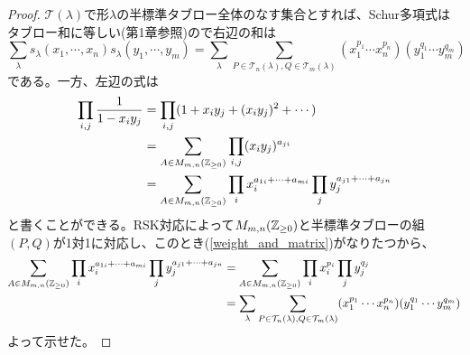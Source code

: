 \documentclass{ltjsreport}
\begin{document}
\begin{proof}
  $\mathcal{T}(\lambda)$で形$\lambda$の半標準タブロー全体のなす集合とすれば、Schur多項式はタブロー和に等しい(第1章参照)ので右辺の和は
  \[
  \sum_{\lambda}s_\lambda(x_1,\cdots,x_n)s_\lambda(y_1,\cdots,y_m)
  =\sum_{\lambda}
  \sum_{P\in\mathcal{T}_n(\lambda),Q\in\mathcal{T}_m(\lambda)}
  (x_1^{p_1}\cdots x_n^{p_n})(y_1^{q_1}\cdots y_m^{q_m})
  \]
  である。一方、左辺の式は
  \begin{align*}
  \prod_{i,j}\frac{1}{1-x_iy_j}&=\prod_{i,j}(1+x_iy_j+(x_iy_j)^2+\cdots)\\
  &=\sum_{A\in M_{m,n}(\mathbb{Z}_{\geq 0})}\prod_{i,j}(x_iy_j)^{a_{ji}}\\
  &=\sum_{A\in M_{m,n}(\mathbb{Z}_{\geq 0})}\prod_i x_i^{a_{1i}+\cdots+a_{mi}}\prod_j y_j^{a_{j1}+\cdots+a_{jn}}
  \end{align*}
  と書くことができる。RSK対応によって$M_{m,n}(\mathbb{Z}_{\geq 0})$と半標準タブローの組$(P,Q)$が1対1に対応し、このとき(\ref{weight_and_matrix})がなりたつから、
  \begin{align*}
    \sum_{A\in M_{m,n}(\mathbb{Z}_{\geq 0})}\prod_i x_i^{a_{1i}+\cdots+a_{mi}}\prod_j y_j^{a_{j1}+\cdots+a_{jn}}
    &=\sum_{A\in M_{m,n}(\mathbb{Z}_{\geq 0})}\prod_i x_i^{p_i}\prod_j y_j^{q_j}\\
    &=\sum_{\lambda}
    \sum_{P\in\mathcal{T}_n(\lambda),Q\in\mathcal{T}_m(\lambda)}
    (x_1^{p_1}\cdots x_n^{p_n})(y_1^{q_1}\cdots y_m^{q_m})
  \end{align*}
  よって示せた。
\end{proof}
\end{document}
